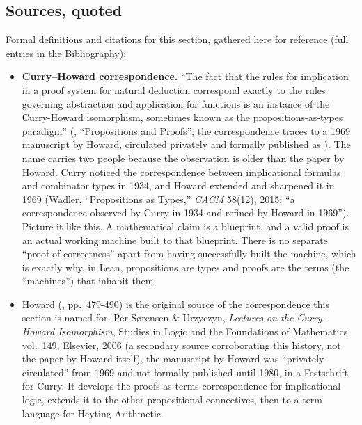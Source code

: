 \subsection{Sources, quoted}\label{sec:04-propositions-and-proofs:01-prop:3}

Formal definitions and citations for this section, gathered here for reference (full entries in the \hyperref[sec:root:bibliography:1]{Bibliography}):

\begin{itemize}
\tightlist
\item
  \textbf{Curry--Howard correspondence.} ``The fact that the rules for implication in a proof system for natural deduction correspond exactly to the rules governing abstraction and application for functions is an instance of the Curry-Howard isomorphism, sometimes known as the propositions-as-types paradigm'' (\cite{TPIL4}, ``Propositions and Proofs''; the correspondence traces to a 1969 manuscript by Howard, circulated privately and formally published as \cite{Howard1980}). The name carries two people because the observation is older than the paper by Howard. Curry noticed the correspondence between implicational formulas and combinator types in 1934, and Howard extended and sharpened it in 1969 (Wadler, ``Propositions as Types,'' \emph{CACM} 58(12), 2015: ``a correspondence observed by Curry in 1934 and refined by Howard in 1969''). Picture it like this. A mathematical claim is a blueprint, and a valid proof is an actual working machine built to that blueprint. There is no separate ``proof of correctness'' apart from having successfully built the machine, which is exactly why, in Lean, propositions are types and proofs are the terms (the ``machines'') that inhabit them.
\item
  Howard (\cite{Howard1980}, pp.~479-490) is the original source of the correspondence this section is named for. Per Sørensen \& Urzyczyn, \emph{Lectures on the Curry-Howard Isomorphism}, Studies in Logic and the Foundations of Mathematics vol.~149, Elsevier, 2006 (a secondary source corroborating this history, not the paper by Howard itself), the manuscript by Howard was ``privately circulated'' from 1969 and not formally published until 1980, in a Festschrift for Curry. It develops the proofs-as-terms correspondence for implicational logic, extends it to the other propositional connectives, then to a term language for Heyting Arithmetic.
\end{itemize}
